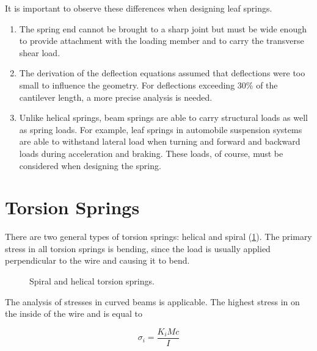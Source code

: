 \documentclass[
10pt,
a4paper,
openany,
svgnames,
]{book}
\begin{document}
It is important to observe these differences when designing leaf springs.
\begin{enumerate}
\item The spring end cannot be brought to a sharp joint but must be wide enough to provide attachment with the loading member and to carry the transverse shear load.
\item The derivation of the deflection equations assumed that deflections were too small to influence the geometry. For deflections exceeding 30\% of the cantilever length, a more precise analysis is needed.
\item Unlike helical springs, beam springs are able to carry structural loads as well as spring loads. For example, leaf springs in automobile suspension systems are able to withstand lateral load when turning and forward and backward loads during acceleration and braking. These loads, of course, must be considered when designing the spring.
\end{enumerate}

\section{Torsion Springs}

There are two general types of torsion springs: helical and spiral (\cref{fig: spiral and helical springs}). The primary stress in all torsion springs is bending, since the load is usually applied perpendicular to the wire and causing it to bend.

\begin{figure}[h]
  \centering
  \caption{Spiral and helical torsion springs.}
  \label{fig: spiral and helical springs}
\end{figure}

The analysis of stresses in curved beams is applicable. The highest stress in on the inside of the wire and is equal to

\[\sigma_i = \frac{K_iMc}{I}\]
\end{document}
